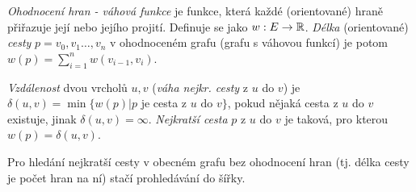 \begin{definice}
\emph{Ohodnocení hran - váhová funkce} je funkce, která každé (orientované) hraně přiřazuje její  nebo  jejího projití. Definuje se jako $w:E\to\mathbb{R}$. \emph{Délka} (orientované) \emph{cesty} $p=v_0,v_1\dots,v_n$ v ohodnoceném grafu (grafu s váhovou funkcí) je potom $w(p)=\sum_{i=1}^n w(v_{i-1},v_i)$.

\emph{Vzdálenost} dvou vrcholů $u,v$ (\emph{váha nejkr. cesty} z $u$ do $v$) je $\delta(u,v) = \min\{ w(p)| p$ je cesta z $u \mbox{ do } v \}$, pokud nějaká cesta z $u$ do $v$ existuje, jinak $\delta(u,v)=\infty$. \emph{Nejkratší cesta} $p$ z $u$ do $v$ je taková, pro kterou $w(p)=\delta(u,v)$.
\end{definice}

\begin{poznamka}
Pro hledání nejkratší cesty v obecném grafu bez ohodnocení hran (tj. délka cesty je počet hran na ní) stačí prohledávání do šířky.
\end{poznamka}

